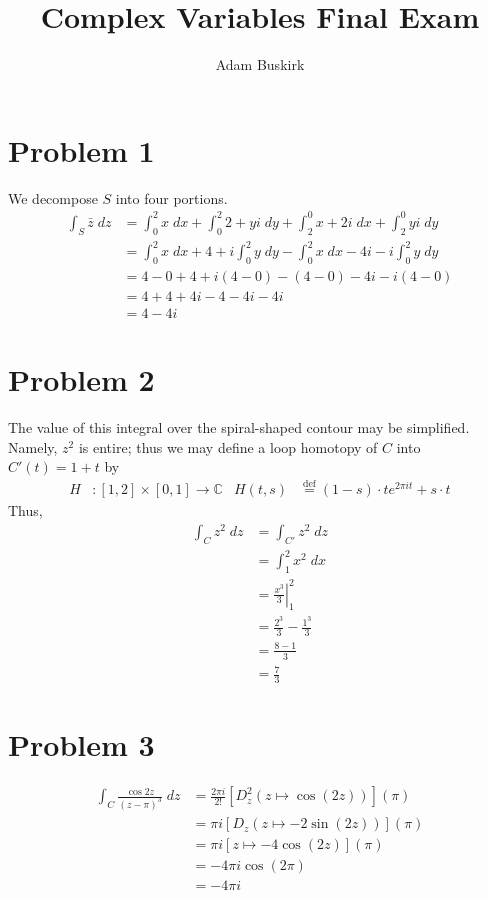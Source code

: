 \documentclass{article}
\title{Complex Variables Final Exam}
\author{Adam Buskirk}
\theoremstyle{definition}
\newcommand{\Co}{\mathbb{C}}
\newcommand{\sq}[1]{\left[#1\right]}
\begin{document}
\maketitle

\section{Problem 1}
We decompose $S$ into four portions.
\begin{align*}
\int_S \bar{z} \;dz
&= 
  \int_0^2 x \;dx
+ \int_0^2 2+yi \;dy
+ \int_2^0 x+2i \;dx
+ \int_2^0 yi \;dy \\
&= 
  \int_0^2 x \;dx
+ 4+i\int_0^2 y \;dy
- \int_0^2 x \;dx-4i
- i\int_0^2 y \;dy \\
&= 
  4-0
+ 4+i(4-0)
- (4-0)-4i
- i(4-0) \\
&= 4+4+4i-4-4i-4i \\
&= 4-4i
\end{align*}

\section{Problem 2}
The value of this integral over the spiral-shaped contour may be simplified. 
Namely, $z^2$ is entire; thus we may define a loop homotopy of $C$
into $C'(t)=1+t$ by
\begin{align*}
H &: [1,2] \times [0,1] \to \Co  &
H(t,s) &\overset{\text{def}}{=} (1-s) \cdot t e^{2 \pi i t} + s \cdot t
\end{align*}
Thus,
\begin{align*}
\int_C z^2 \;dz
&= \int_{C'} z^2 \;dz \\
&= \int_1^2 x^2 \;dx \\
&= \left.\frac{x^3}{3}\right|_1^2 \\
&= \frac{2^3}{3} - \frac{1^3}{3} \\
&= \frac{8-1}{3} \\
&= \frac{7}{3}
\end{align*}
\section{Problem 3}
\begin{align*}
\int_C \frac{\cos 2z}{(z-\pi)^3} \;dz
&= \frac{2 \pi i}{2!} \sq{D_z^2 (z \mapsto \cos(2z))}(\pi) \\
&= \pi i \sq{D_z (z \mapsto -2\sin(2z))}(\pi) \\
&= \pi i \sq{z \mapsto -4 \cos(2z)}(\pi) \\
&= -4 \pi i \cos(2\pi) \\
&= -4 \pi i
\end{align*}
\end{document}
